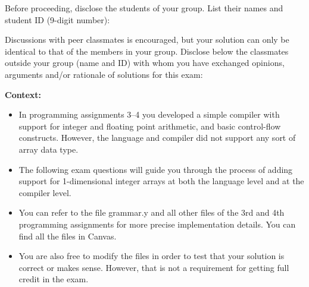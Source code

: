 \documentclass{article}
\begin{document}
\vspace{2em}

Before proceeding, disclose the students of your group. List their names and student ID (9-digit number):

\begin{tcolorbox}[height=1.5in]

\end{tcolorbox}

\pagebreak

Discussions with peer classmates is encouraged, but your solution can only be
identical to that of the members in your group.  Disclose below the classmates
outside your group (name and ID) with whom you have exchanged opinions,
arguments and/or rationale of solutions for this exam:

\begin{tcolorbox}[height=3in]

\end{tcolorbox}


\vspace{1em}

{\bf Context:}

\begin{itemize}

\item
In programming assignments 3--4 you developed a simple compiler with support for
integer and floating point arithmetic, and basic control-flow constructs.
However, the language and compiler did not support any sort of array data type.

\item
The following exam questions will guide you through the process of adding support
for 1-dimensional integer arrays at both the language level and at the compiler
level.

\item
You can refer to the file grammar.y and all other files of the 3rd and 4th programming assignments for
more precise implementation details. You can find all the files in Canvas.

\item
You are also free to modify the files in order to test that your solution is correct or makes
sense. However, that is not a requirement for getting full credit in the exam.

\end{itemize}


\pagebreak


\pagebreak



\pagebreak


\pagebreak


\pagebreak
\end{document}
